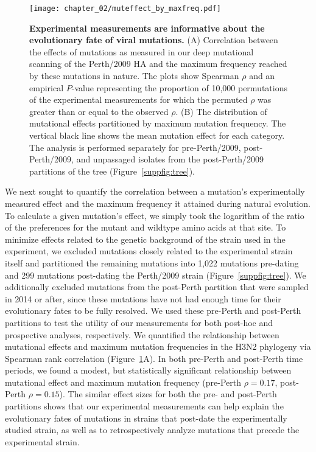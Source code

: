 \begin{figure}
  \centering
  \texttt{[image: chapter\_02/muteffect\_by\_maxfreq.pdf]}
  \caption[{Experimental measurements are informative about the evolutionary fate of viral mutations.}]{\label{fig:muteffect_maxfreq}
    {\bf Experimental measurements are informative about the evolutionary fate of viral mutations.}
    (A) Correlation between the effects of mutations as measured in our deep mutational scanning of the Perth/2009 HA and the maximum frequency reached by these mutations in nature.
    The plots show Spearman $\rho$ and an empirical $P$-value representing the proportion of 10,000 permutations of the experimental measurements for which the permuted $\rho$ was greater than or equal to the observed $\rho$.
    (B) The distribution of mutational effects partitioned by maximum mutation frequency.
    The vertical black line shows the mean mutation effect for each category.
    The analysis is performed separately for pre-Perth/2009, post-Perth/2009, and unpassaged isolates from the post-Perth/2009 partitions of the tree (Figure~\ref{suppfig:tree}).
}
\end{figure}

We next sought to quantify the correlation between a mutation's experimentally measured effect and the maximum frequency it attained during natural evolution.
To calculate a given mutation's effect, we simply took the logarithm of the ratio of the preferences for the mutant and wildtype amino acids at that site.
To minimize effects related to the genetic background of the strain used in the experiment, we excluded mutations closely related to the experimental strain itself and partitioned the remaining mutations into 1,022 mutations pre-dating and 299 mutations post-dating the Perth/2009 strain (Figure~\ref{suppfig:tree}).
We additionally excluded mutations from the post-Perth partition that were sampled in 2014 or after, since these mutations have not had enough time for their evolutionary fates to be fully resolved.
We used these pre-Perth and post-Perth partitions to test the utility of our measurements for both post-hoc and prospective analyses, respectively.
We quantified the relationship between mutational effects and maximum mutation frequencies in the H3N2 phylogeny via Spearman rank correlation (Figure~\ref{fig:muteffect_maxfreq}A).
In both pre-Perth and post-Perth time periods, we found a modest, but statistically significant relationship between mutational effect and maximum mutation frequency (pre-Perth $\rho = 0.17$, post-Perth $\rho = 0.15$).
The similar effect sizes for both the pre- and post-Perth partitions shows that our experimental measurements can help explain the evolutionary fates of mutations in strains that post-date the experimentally studied strain, as well as to retrospectively analyze mutations that precede the experimental strain.


